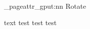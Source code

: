 \documentclass{article}
\begin{document}
\ExplSyntaxOn\makeatletter
\protected{}
\pdf_pageattr_gput:nn {Rotate}{\rotatepage}
\ExplSyntaxOff

text \newpage test \newpage test \newpage test
\end{document}
